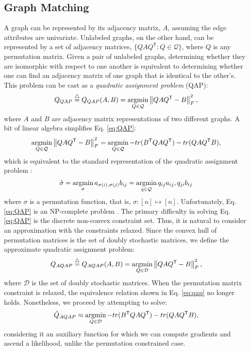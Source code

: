 \documentclass{article} %
\providecommand{\norm}[1]{\left \lVert#1 \right  \rVert}
\newcommand{\argmin}{\operatornamewithlimits{argmin}}
\newcommand{\T}{^{\ensuremath{\mathsf{T}}}}           %
\providecommand{\mc}[1]{\mathcal{#1}}
\providecommand{\mh}[1]{\hat{#1}}
\newcommand{\defeq}{\overset{\triangle}{=}}
\begin{document}

\subsection{Graph Matching} %
\label{sec:quadratic_assignment_problem}

A graph can be represented by its adjacency matrix, $A$, assuming the edge attributes are univariate.  Unlabeled graphs, on the other hand, can be represented by a set of adjacency matrices, $\{QAQ\T : Q \in \mc{Q}\}$, where $Q$ is any permutation matrix.  Given a pair of unlabeled graphs, determining whether they are isomorphic with respect to one another is equivalent to determining whether one can find an adjacency matrix of one graph that is identical to the other's.  This problem can be cast as a \emph{quadratic assignment problem} (QAP):
 \begin{align} \label{eq:QAP}
	Q_{QAP} \defeq Q_{QAP}(A,B)= \argmin_{Q \in \mc{Q}} \norm{Q A Q\T - B}^2_F,
\end{align}
where $A$ and $B$ are adjacency matrix representations of two different graphs. A bit of linear algebra simplifies Eq. \eqref{eq:QAP}: %
\begin{align} \label{eq:qap}
	\argmin_{Q \in \mc{Q}} \norm{Q A Q\T - B}^2_F = \argmin_{Q \in \mc{Q}} - tr(B\T QAQ\T) - tr(QAQ\T B),			
\end{align}
which is equivalent to the standard representation of the quadratic assignment problem \cite{Conte2004}:
\begin{align}
	\mh{\sigma}= \argmin_{\sigma} a_{\sigma(i), \sigma(j)} b_{ij} = \argmin_{q \in \mc{Q}} q_{ij} a_{ij}, q_{ji} b_{ij}
\end{align}
where $\sigma$ is a permutation function, that is, $\sigma: [n] \mapsto [n]$.  Unfortunately, Eq. \eqref{eq:QAP} is an NP-complete problem \cite{Garey1979a}. The primary difficulty in solving Eq. \eqref{eq:QAP} is the discrete non-convex constraint set.  Thus, it is natural to consider an approximation with the constraints relaxed.  Since the convex hull of permutation matrices is the set of doubly stochastic matrices, we define the approximate quadratic assignment problem:
\begin{align} \label{eq:tqap}
	Q_{AQAP} \defeq Q_{AQAP}(A,B) = \argmin_{Q \in \mc{D}} \norm{Q A Q\T - B}^2_F,
\end{align}
where $\mc{D}$ is the set of doubly stochastic matrices.  When the permutation matrix constraint is relaxed, the equivalence relation shown in Eq. \eqref{eq:qap} no longer holds.  Nonetheless, we proceed by attempting to solve:
\begin{align} \label{eq:nqap}
	\mh{Q}_{AQAP} \approx \argmin_{Q \in \mc{D}} - tr(B\T QAQ\T) - tr(QAQ\T B),
\end{align}
considering it an auxiliary function for which we can compute gradients and ascend a likelihood, unlike the permutation constrained case.  
\end{document}

